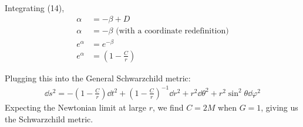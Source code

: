 \documentclass[12pt]{article}
\begin{document}
Integrating (14),
\begin{align}
  \alpha &= -\beta + D \nonumber\\
  \alpha &= -\beta \text{ (with a coordinate redefinition)} \nonumber \\
  e^\alpha &= e^{-\beta} \nonumber \\
  e^\alpha &= \left(1-\frac{C}{r}\right)
\end{align}

Plugging this into the General Schwarzchild metric:
\begin{align}
  \dd{s^2} = -\left(1-\frac{C}{r}\right)\dd{t^2} + \left(1-\frac{C}{r}\right)^{-1}\dd{r^2} + r^2\dd{\theta^2} + r^2\sin^2{\theta}\dd{\varphi^2}
\end{align}
Expecting the Newtonian limit at large $r$, we find $C = 2M$ when $G=1$, giving us the Schwarzchild metric.
\end{document}
